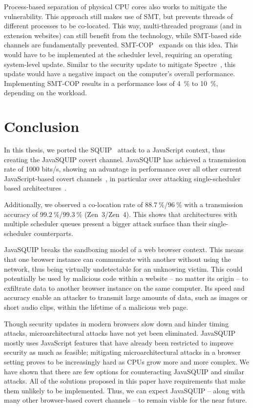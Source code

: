 \documentclass[11pt,
  titlepage=false,
  parskip=half,      %
]{scrreprt}
\begin{document}
Process-based separation of physical CPU cores also works to mitigate the vulnerability.
This approach still makes use of SMT, but prevents threads of different processes to be co-located.
This way, multi-threaded programs (and in extension websites) can still benefit from the technology,
while SMT-based side channels are fundamentally prevented.
SMT-COP~\cite{townley2019smt} expands on this idea.
This would have to be implemented at the scheduler level, requiring an operating system-level update.
Similar to the security update to mitigate Spectre~\cite{spKocherHFGGHHLM019},
this update would have a negative impact on the computer's overall performance.
Implementing SMT-COP results in a performance loss of 4~\% to 10~\%, depending on the workload.

\chapter{Conclusion}
\label{ch:conclusion}
In this thesis, we ported the SQUIP~\cite{squip} attack to a JavaScript context, thus creating the JavaSQUIP covert channel.
JavaSQUIP has achieved a transmission rate of 1000 bits/s, showing an advantage in performance over
all other current JavaScript-based covert channels~\cite{vila2017loophole, lipp2017practical},
in particular over attacking single-scheduler based architectures~\cite{Rokicki2022webport}.

Additionally, we observed a co-location rate of $88.7~\%$/$96~\%$ with a transmission accuracy of $99.2~\%$/$99.3~\%$ (Zen~3/Zen~4).
This shows that architectures with multiple scheduler queues present a bigger attack surface than their single-scheduler counterparts.

JavaSQUIP breaks the sandboxing model of a web browser context.
This means that one browser instance can communicate with another without using the network, thus being virtually undetectable for an unknowing victim.
This could potentially be used by malicious code within a website -- no matter its origin -- to exfiltrate data to another browser instance on the same computer.
Its speed and accuracy enable an attacker to transmit large amounts of data, such as images or short audio clips, within the lifetime of a malicious web page.

Though security updates in modern browsers slow down and hinder timing attacks, microarchitectural attacks have not yet been eliminated.
JavaSQUIP mostly uses JavaScript features that have already been restricted to improve security as much as feasible;
mitigating microarchitectural attacks in a browser setting proves to be increasingly hard as CPUs grow more and more complex.
We have shown that there are few options for counteracting JavaSQUIP and similar attacks.
All of the solutions proposed in this paper have requirements that make them unlikely to be implemented.
Thus, we can expect JavaSQUIP -- along with many other browser-based covert channels --
to remain viable for the near future.


\pagebreak
\printbibliography
\end{document}
